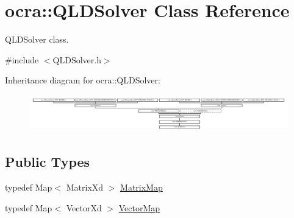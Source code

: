 \hypertarget{classocra_1_1QLDSolver}{}\section{ocra\+:\+:Q\+L\+D\+Solver Class Reference}
\label{classocra_1_1QLDSolver}


Q\+L\+D\+Solver class.  




{\ttfamily \#include $<$Q\+L\+D\+Solver.\+h$>$}

Inheritance diagram for ocra\+:\+:Q\+L\+D\+Solver\+:\begin{figure}[H]
\begin{center}
\leavevmode
\includegraphics[height=1.623188cm]{d2/dab/classocra_1_1QLDSolver}
\end{center}
\end{figure}
\subsection*{Public Types}
\begin{DoxyCompactItemize}
\item 
typedef Map$<$ Matrix\+Xd $>$ \hyperlink{classocra_1_1QLDSolver_aebfc53b837336b9942a8ed2e6ca6c0e2}{Matrix\+Map}
\item 
typedef Map$<$ Vector\+Xd $>$ \hyperlink{classocra_1_1QLDSolver_a0f7e278b557ca2b7fad6d059ee87a707}{Vector\+Map}
\end{DoxyCompactItemize}
